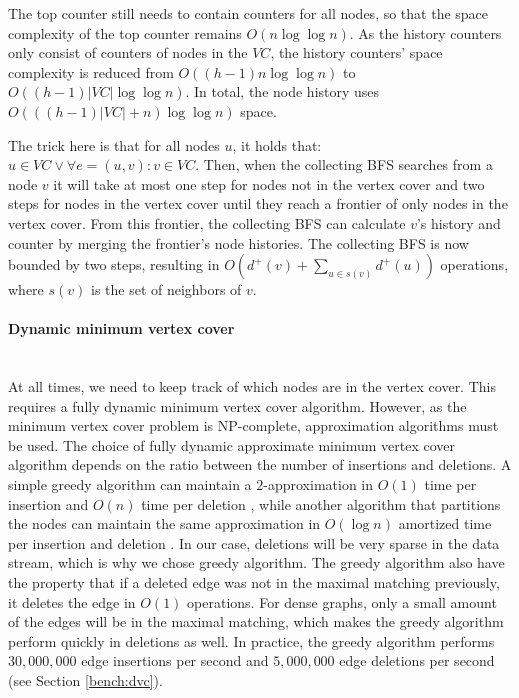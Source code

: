 The top counter still needs to contain counters for all nodes, so that the space complexity of the top counter remains $O(n\log \log n)$. As the history counters only consist of counters of nodes in the $VC$, the history counters' space complexity is reduced from $O((h-1)n \log \log n)$ to $O((h-1)|VC| \log \log n)$. In total, the node history uses $O(((h-1)|VC| + n )\log \log n)$ space.

The trick here is that for all nodes $u$, it holds that: $u \in VC \vee \forall e = (u,v) : v \in VC$. Then, when the collecting BFS searches from a node $v$ it will take at most one step for nodes not in the vertex cover and two steps for nodes in the vertex cover until they reach a frontier of only nodes in the vertex cover. From this frontier, the collecting BFS can calculate $v$'s history and counter by merging the frontier's node histories. The collecting BFS is now bounded by two steps, resulting in $O(d^+(v) + \sum_{u \in s(v)}{d^+(u)})$ operations, where $s(v)$ is the set of neighbors of $v$.

\paragraph{Dynamic minimum vertex cover} \mbox{} \\
At all times, we need to keep track of which nodes are in the vertex cover. This requires a fully dynamic minimum vertex cover algorithm. However, as the minimum vertex cover problem is NP-complete, approximation algorithms must be used. The choice of fully dynamic approximate minimum vertex cover algorithm depends on the ratio between the number of insertions and deletions. A simple greedy algorithm can maintain a $2$-approximation in $O(1)$ time per insertion and $O(n)$ time per deletion \cite{2appdynvc}, while another algorithm that partitions the nodes can maintain the same approximation in $O(\log n )$ amortized time per insertion and deletion \cite{2appdynvclogn}. In our case, deletions will be very sparse in the data stream, which is why we chose greedy algorithm. The greedy algorithm also have the property that if a deleted edge was not in the maximal matching previously, it deletes the edge in $O(1)$ operations. For dense graphs, only a small amount of the edges will be in the maximal matching, which makes the greedy algorithm perform quickly in deletions as well. In practice, the greedy algorithm performs $30,000,000$ edge insertions per second and $5,000,000$ edge deletions per second (see Section \ref{bench:dvc}).
 
